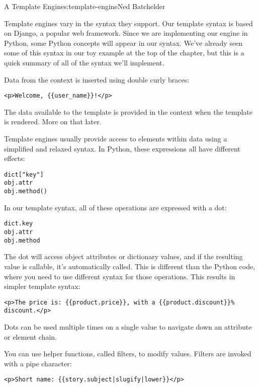 \begin{aosachapter}{A Template Engine}{s:template-engine}{Ned Batchelder}
\label{supported-syntax}

Template engines vary in the syntax they support. Our template syntax is
based on Django, a popular web framework. Since we are implementing our
engine in Python, some Python concepts will appear in our syntax. We've
already seen some of this syntax in our toy example at the top of the
chapter, but this is a quick summary of all of the syntax we'll
implement.

Data from the context is inserted using double curly braces:

\begin{verbatim}
<p>Welcome, {{user_name}}!</p>
\end{verbatim}

The data available to the template is provided in the context when the
template is rendered. More on that later.

Template engines usually provide access to elements within data using a
simplified and relaxed syntax. In Python, these expressions all have
different effects:

\begin{verbatim}
dict["key"]
obj.attr
obj.method()
\end{verbatim}

In our template syntax, all of these operations are expressed with a
dot:

\begin{verbatim}
dict.key
obj.attr
obj.method
\end{verbatim}

The dot will access object attributes or dictionary values, and if the
resulting value is callable, it's automatically called. This is
different than the Python code, where you need to use different syntax
for those operations. This results in simpler template syntax:

\begin{verbatim}
<p>The price is: {{product.price}}, with a {{product.discount}}% discount.</p>
\end{verbatim}

Dots can be used multiple times on a single value to navigate down an
attribute or element chain.

You can use helper functions, called filters, to modify values. Filters
are invoked with a pipe character:

\begin{verbatim}
<p>Short name: {{story.subject|slugify|lower}}</p>
\end{verbatim}


\end{aosachapter}
